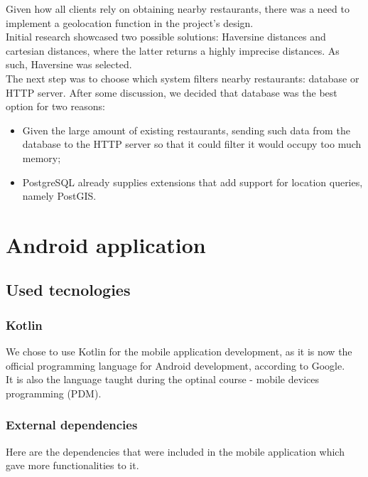 Given how all clients rely on obtaining nearby restaurants, there was a need to implement a geolocation function in the project's design.\\

Initial research showcased two possible solutions: Haversine\cite{haversine} distances and cartesian distances, where the latter returns a highly imprecise distances.
As such, Haversine was selected.\\

The next step was to choose which system filters nearby restaurants: database or HTTP server. After some discussion, we decided that database was the best
option for two reasons: 
\begin{itemize}
    \item Given the large amount of existing restaurants, sending such data from the database to the HTTP server so that it could filter it would occupy too much memory;
    \item PostgreSQL already supplies extensions that add support for location queries, namely PostGIS.
\end{itemize}

\section{Android application}

\subsection{Used tecnologies}

\subsubsection{Kotlin}

We chose to use Kotlin for the mobile application development, as it is now the official programming language for Android development,
according to Google.\\

It is also the language taught during the optinal course - mobile devices programming (PDM).\\

\subsubsection{External dependencies}

Here are the dependencies that were included in the mobile application which gave more functionalities to it.

